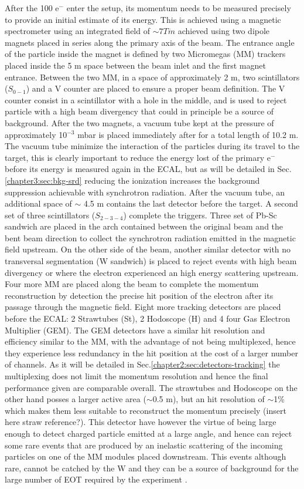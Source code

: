 After the 100 \gev e$^-$ enter the setup, its momentum needs to be measured precisely to provide an initial estimate of its energy. This is achieved using a magnetic spectrometer using an integrated field of $\sim 7 T \dot m$ achieved using two dipole magnets \cite{mbpl} placed in series along the primary axis of the beam. The entrance angle of the particle inside the magnet is defined by two Micromegas (MM) trackers placed inside the 5 m space between the beam inlet and the first magnet entrance. Between the two MM, in a space of approximately 2 m, two scintillators ($S_{0-1}$) and a V counter are placed to ensure a proper beam definition. The V counter consist in a scintillator with a hole in the middle, and is used to reject particle with a high beam divergency that could in principle be a source of background. After the two magnets, a vacuum tube kept at the pressure of approximately 10$^{-3}$ \si{mbar} is placed immediately after for a total length of 10.2 \si{m}. The vacuum tube minimize the interaction of the particles during its travel to the target, this is clearly important to reduce the energy lost of the primary e$^-$ before its energy is measured again in the ECAL, but as will be detailed in Sec.\ref{chapter3:sec:bkg-srd} reducing the ionization increases the background suppression achievable with synchrotron radiation. After the vacuum tube, an additional space of $\sim$ 4.5 \si{m} contains the last detector before the target. A second set of three scintillators ($S_{2-3-4}$) complete the triggers. Three set of Pb-Sc sandwich are placed in the arch contained between the original beam and the bent beam direction to collect the synchrotron radiation emitted in the magnetic field upstream. On the other side of the beam, another similar detector with no transversal segmentation (W sandwich) is placed to reject events with high beam divergency or where the electron experienced an high energy scattering upstream. Four more MM are placed along the beam to complete the momentum reconstruction by detection the precise hit position of the electron after its passage through the magnetic field. Eight more tracking detectors are placed before the ECAL: 2 Strawtubes (St), 2 Hodoscope (H) and 4 four Gas Electron Multiplier (GEM). The GEM detectors have a similar hit resolution and efficiency similar to the MM, with the advantage of not being multiplexed, hence they experience less redundancy in the hit position at the cost of a larger number of channels. As it will be detailed in Sec.\ref{chapter2:sec:detectors-tracking} the multiplexing does not limit the momentum resolution and hence the final performance given are comparable overall. The strawtubes and Hodoscope on the other hand posses a larger active area ($\sim$0.5 m), but an hit resolution of $\sim$1\% which makes them less suitable to reconstruct the momentum precisely (insert here straw reference?). This detector have however the virtue of being large enough to detect charged particle emitted at a large angle, and hence can reject some rare events that are produced by an inelastic scattering of the incoming particles on one of the MM modules placed downstream. This events although rare, cannot be catched by the W and they can be a source of background for the large number of EOT required by the experiment \cite{na64-prd}. 

